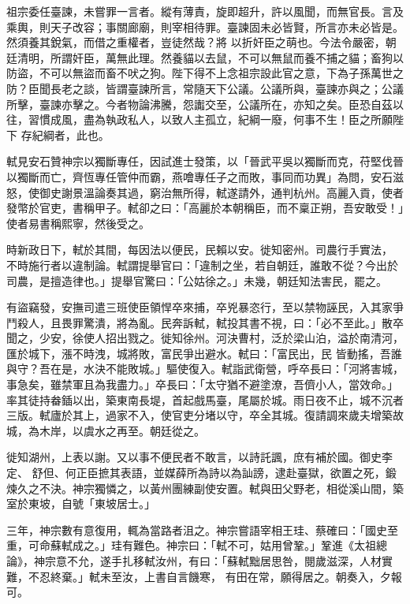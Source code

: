 \begin{pinyinscope}
 祖宗委任臺諫，未嘗罪一言者。縱有薄責，旋即超升，許以風聞，而無官長。言及乘輿，則天子改容；事關廊廟，則宰相待罪。臺諫固未必皆賢，所言亦未必皆是。然須養其銳氣，而借之重權者，豈徒然哉？將
 以折奸臣之萌也。今法令嚴密，朝廷清明，所謂奸臣，萬無此理。然養貓以去鼠，不可以無鼠而養不捕之貓；畜狗以防盜，不可以無盜而畜不吠之狗。陛下得不上念祖宗設此官之意，下為子孫萬世之防？臣聞長老之談，皆謂臺諫所言，常隨天下公議。公議所與，臺諫亦與之；公議所擊，臺諫亦擊之。今者物論沸騰，怨讟交至，公議所在，亦知之矣。臣恐自茲以往，習慣成風，盡為執政私人，以致人主孤立，紀綱一廢，何事不生！臣之所願陛下
 存紀綱者，此也。



 軾見安石贊神宗以獨斷專任，因試進士發策，以「晉武平吳以獨斷而克，苻堅伐晉以獨斷而亡，齊恆專任管仲而霸，燕噲專任子之而敗，事同而功異」為問，安石滋怒，使御史謝景溫論奏其過，窮治無所得，軾遂請外，通判杭州。高麗入貢，使者發幣於官吏，書稱甲子。軾卻之曰：「高麗於本朝稱臣，而不稟正朔，吾安敢受！」使者易書稱熙寧，然後受之。



 時新政日下，軾於其間，每因法以便民，民賴以安。徙知密州。司農行手實法，
 不時施行者以違制論。軾謂提舉官曰：「違制之坐，若自朝廷，誰敢不從？今出於司農，是擅造律也。」提舉官驚曰：「公姑徐之。」未幾，朝廷知法害民，罷之。



 有盜竊發，安撫司遣三班使臣領悍卒來捕，卒兇暴恣行，至以禁物誣民，入其家爭鬥殺人，且畏罪驚潰，將為亂。民奔訴軾，軾投其書不視，曰：「必不至此。」散卒聞之，少安，徐使人招出戮之。徙知徐州。河決曹村，泛於梁山泊，溢於南清河，匯於城下，漲不時洩，城將敗，富民爭出避水。軾曰：「富民出，民
 皆動搖，吾誰與守？吾在是，水決不能敗城。」驅使復入。軾詣武衛營，呼卒長曰：「河將害城，事急矣，雖禁軍且為我盡力。」卒長曰：「太守猶不避塗潦，吾儕小人，當效命。」率其徒持畚鍤以出，築東南長堤，首起戲馬臺，尾屬於城。雨日夜不止，城不沉者三版。軾廬於其上，過家不入，使官吏分堵以守，卒全其城。復請調來歲夫增築故城，為木岸，以虞水之再至。朝廷從之。



 徙知湖州，上表以謝。又以事不便民者不敢言，以詩託諷，庶有補於國。御史李定、
 舒但、何正臣摭其表語，並媒薛所為詩以為訕謗，逮赴臺獄，欲置之死，鍛煉久之不決。神宗獨憐之，以黃州團練副使安置。軾與田父野老，相從溪山間，築室於東坡，自號「東坡居士。」



 三年，神宗數有意復用，輒為當路者沮之。神宗嘗語宰相王珪、蔡確曰：「國史至重，可命蘇軾成之。」珪有難色。神宗曰：「軾不可，姑用曾鞏。」鞏進《太祖總論》，神宗意不允，遂手扎移軾汝州，有曰：「蘇軾黜居思咎，閱歲滋深，人材實難，不忍終棄。」軾未至汝，上書自言饑寒，
 有田在常，願得居之。朝奏入，夕報可。




\end{pinyinscope}
